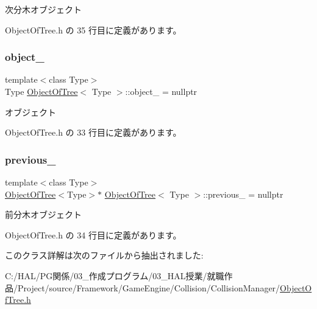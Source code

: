 次分木オブジェクト 



 Object\+Of\+Tree.\+h の 35 行目に定義があります。

\mbox{\label{class_object_of_tree_ad3ce36879f78ba2c2171385a8428c7ba}} 
\subsubsection{\texorpdfstring{object\+\_\+}{object\_}}
{\footnotesize\ttfamily template$<$class Type$>$ \\
Type \mbox{\hyperlink{class_object_of_tree}{Object\+Of\+Tree}}$<$ Type $>$\+::object\+\_\+ = nullptr\hspace{0.3cm}{\ttfamily [private]}}



オブジェクト 



 Object\+Of\+Tree.\+h の 33 行目に定義があります。

\mbox{\label{class_object_of_tree_ac219b6d840381214e54bb248ac1c2693}} 
\subsubsection{\texorpdfstring{previous\+\_\+}{previous\_}}
{\footnotesize\ttfamily template$<$class Type$>$ \\
\mbox{\hyperlink{class_object_of_tree}{Object\+Of\+Tree}}$<$Type$>$$\ast$ \mbox{\hyperlink{class_object_of_tree}{Object\+Of\+Tree}}$<$ Type $>$\+::previous\+\_\+ = nullptr\hspace{0.3cm}{\ttfamily [private]}}



前分木オブジェクト 



 Object\+Of\+Tree.\+h の 34 行目に定義があります。



このクラス詳解は次のファイルから抽出されました\+:\begin{DoxyCompactItemize}
\item 
C\+:/\+H\+A\+L/\+P\+G関係/03\+\_\+作成プログラム/03\+\_\+\+H\+A\+L授業/就職作品/\+Project/source/\+Framework/\+Game\+Engine/\+Collision/\+Collision\+Manager/\mbox{\hyperlink{_object_of_tree_8h}{Object\+Of\+Tree.\+h}}\end{DoxyCompactItemize}
